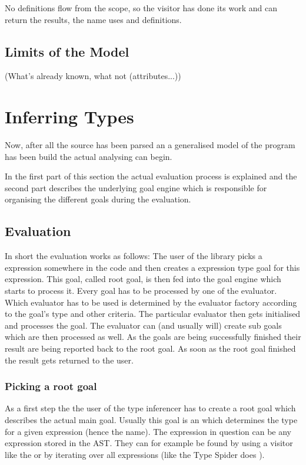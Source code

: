 \documentclass[12pt,halfparskip]{scrreprt}
\begin{document}
No definitions flow from the scope, so the visitor has done its work and can return the results, the name uses and definitions.

\subsection{Limits of the Model}

(What's already known, what not (attributes...))


\section{Inferring Types}

Now, after all the source has been parsed an a generalised model of the program has been build the actual analysing can begin. 

In the first part of this section the actual evaluation process is explained and the second part describes the underlying goal engine which is responsible for organising the different goals during the evaluation.

\subsection{Evaluation}


In short the evaluation works as follows: The user of the library picks a expression somewhere in the code and then creates a expression type goal for this expression. This goal, called root goal, is then fed into the goal engine which starts to process it. Every goal has to be processed by one of the evaluator. Which evaluator has to be used is determined by the evaluator factory according to the goal's type and other criteria. The particular evaluator then gets initialised and processes the goal. The evaluator can (and usually will) create sub goals which are then processed as well. As the goals are being successfully finished their result are being reported back to the root goal. As soon as the root goal finished the result gets returned to the user.


\subsubsection{Picking a root goal}

As a first step the the user of the type inferencer has to create a root goal which describes the actual main goal. Usually this goal is an  which determines the type for a given expression (hence the name). The expression in question can be any expression stored in the AST. They can for example be found by using a visitor like the  or by iterating over all expressions (like the Type Spider does ).
\end{document}
